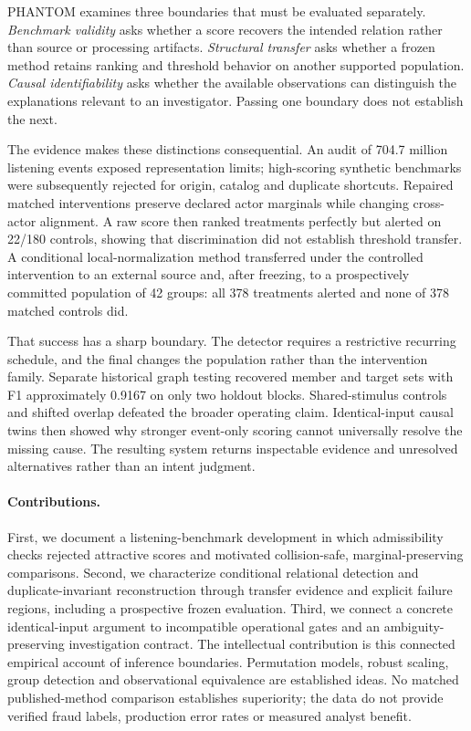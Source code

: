 \documentclass[sigconf,nonacm]{acmart}
\begin{document}
PHANTOM examines three boundaries that must be evaluated separately. \emph{Benchmark validity} asks whether a score recovers the intended relation rather than source or processing artifacts. \emph{Structural transfer} asks whether a frozen method retains ranking and threshold behavior on another supported population. \emph{Causal identifiability} asks whether the available observations can distinguish the explanations relevant to an investigator. Passing one boundary does not establish the next.

The evidence makes these distinctions consequential. An audit of 704.7 million listening events exposed representation limits; high-scoring synthetic benchmarks were subsequently rejected for origin, catalog and duplicate shortcuts. Repaired matched interventions preserve declared actor marginals while changing cross-actor alignment. A raw score then ranked treatments perfectly but alerted on 22/180 controls, showing that discrimination did not establish threshold transfer. A conditional local-normalization method transferred under the controlled intervention to an external source and, after freezing, to a prospectively committed population of 42 groups: all 378 treatments alerted and none of 378 matched controls did.

That success has a sharp boundary. The detector requires a restrictive recurring schedule, and the final changes the population rather than the intervention family. Separate historical graph testing recovered member and target sets with F1 approximately 0.9167 on only two holdout blocks. Shared-stimulus controls and shifted overlap defeated the broader operating claim. Identical-input causal twins then showed why stronger event-only scoring cannot universally resolve the missing cause. The resulting system returns inspectable evidence and unresolved alternatives rather than an intent judgment.

\paragraph{Contributions.} First, we document a listening-benchmark development in which admissibility checks rejected attractive scores and motivated collision-safe, marginal-preserving comparisons. Second, we characterize conditional relational detection and duplicate-invariant reconstruction through transfer evidence and explicit failure regions, including a prospective frozen evaluation. Third, we connect a concrete identical-input argument to incompatible operational gates and an ambiguity-preserving investigation contract. The intellectual contribution is this connected empirical account of inference boundaries. Permutation models, robust scaling, group detection and observational equivalence are established ideas. No matched published-method comparison establishes superiority; the data do not provide verified fraud labels, production error rates or measured analyst benefit.
\end{document}
